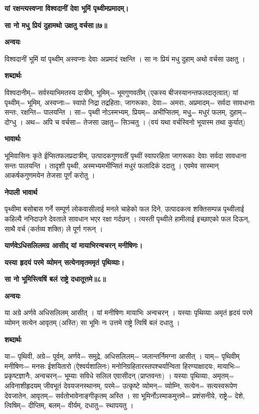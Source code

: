 \documentclass[11pt, a5paper]{article}
\begin{document}
\textbf{यां रक्षन्त्यस्वप्ना विश्वदानीं देवा भूमिं पृथ्वीमप्रमादम्।}

\textbf{सा नो मधु प्रियं दुहामथो उक्षतु वर्चसा॥७॥}

\textbf{अन्वयः}

विश्वदानीं भूमिं यां पृथ्वीम् अस्वप्नाः देवाः अप्रमादं रक्षन्ति । सा नः प्रियं मधु दुहाम् अथो वर्चसा उक्षतु ।

\textbf{शब्दार्थः}

विश्वदानीम्= सर्वस्याभिमतस्य दात्रीम्, भूमिम्= भूमगुणवतीम् (एकस्य बीजस्यानन्तफलदातृत्वात्) यां पृथ्वीम्= भूमिम्, अस्वप्नाः= स्वापो निद्रा तद्रहिताः, जागरूकाः, देवाः= अमराः, अप्रमादम्= सर्वदा सावधानाः सन्तः, रक्षन्ति= पालयन्ति । सा= पृथ्वी नोऽस्मभ्यम्, प्रियम्= अभीप्सितम्, मधुु= मधुरं फलम्, दुहाम्= दोग्धु । अथ= अपि च वर्चसा= तेजसा उक्षतु= सिञ्चतु । (वयं यथा वर्चस्विनो भूयास्म तथा कुर्यात्)

\textbf{भावार्थः}

भूमिवासिनः कृते ईप्सितफलप्रदात्रीम्, उत्पादकगुणवतीं पृथ्वीं स्वापरहिता जागरूकाः देवाः सर्वदा सावधाना सन्तः पालयन्ति । तादृशी पृथ्वी, अस्मभ्यमभीप्सितं मधुरं फलादिकं ददातु । एवमेव सास्मान् आकर्षकगुणमयेन तेजसा पूर्णं करोतु ।

\textbf{नेपाली भावार्थ}

पृथ्वीमा बसोबास गर्ने सम्पूर्ण लोकवासीलाई मनले चाहेको फल दिने, उत्पादकत्व शक्तिसम्पन्न पृथ्वीलाई कहिल्यै ननिदाउने देवताले सावधान भएर रक्षा गर्दछन् । त्यस्ती पृथ्वीले हामीलाई इच्छाएको फल दिऊन्, साथै वर्च (कर्तव्य शक्ति) ले पूर्ण गरून् ।

\textbf{यार्णवेऽधिसलिलमग्र आसीद् यां मायाभिरन्वचरन् मनीषिणः।}

\textbf{यस्या हृदयं परमे व्योमन् सत्येनावृतममृतं पृथिव्याः।}

\textbf{सा नो भूमिस्त्विषिं बलं राष्ट्रे दधातूत्तमे॥८॥}

\textbf{अन्वयः}

या अग्रे अर्णवे अधिसलिलम् आसीत् । यां मनीषिणः मायाभिः अन्वचरन् । यस्याः पृथिव्याः अमृतं हृदयं परमे व्योमन् सत्येन आवृतम् (अस्ति) सा भूमिः नः उत्तमे राष्ट्रे त्विषिं बलं दधातु ।

\textbf{शब्दार्थः}

या= पृथिवी, अग्रे= पूर्वम्, अर्णवे= समुद्रे, अधिसलिलम्= जलान्तर्निमग्ना आसीत् । याम्= पृथिवीम् मनीषिणः= मनसः ईशयितारो (ऐश्वर्यशालिनः) मनोनिग्रहितारस्तपश्चर्यान्विता हिरण्याक्षादयः, मायाभिः= प्रकृष्टज्ञानैः, अन्वचरन्= भूम्याः सविधे सलिल एवासीदन् (प्राप्तवन्तः) । यस्याः पृथिव्याः, अमृतम्= अविनाशीहृदयम् जीवभूतं देवयजनस्थानम्, परमे= उत्कृष्टे व्योमन्= व्योम्नि, सत्येन= सत्यस्वरूपेण देवजातेन, आवृतम्= सर्वतोभावेनाङ्गीकृतम् अस्ति । सा भूमिर्नोऽस्माकमुत्तमे= प्रशंसनीये, राष्ट्रे= देशे, त्विषिम्= दीप्तिम्, बलम्= वीर्यम्, दधातु= स्थापयतु ।
\end{document}
